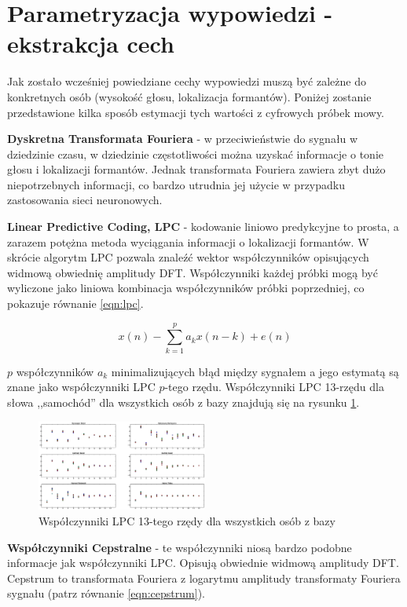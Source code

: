 \documentclass[journal]{IEEEtran}
\begin{document}
\section{Parametryzacja wypowiedzi - ekstrakcja cech}

Jak zostało wcześniej powiedziane cechy wypowiedzi muszą być zależne do
konkretnych osób (wysokość głosu, lokalizacja formantów). Poniżej zostanie
przedstawione kilka sposób estymacji tych wartości z cyfrowych próbek mowy.

\textbf{Dyskretna Transformata Fouriera} - w przeciwieństwie do sygnału w
dziedzinie czasu, w dziedzinie częstotliwości można uzyskać informacje o tonie
głosu i lokalizacji formantów. Jednak transformata Fouriera zawiera zbyt dużo
niepotrzebnych informacji, co bardzo utrudnia jej użycie w przypadku
zastosowania sieci neuronowych.

\textbf{Linear Predictive Coding, LPC} - kodowanie liniowo predykcyjne to
prosta, a zarazem potężna metoda wyciągania informacji o lokalizacji formantów.
W skrócie algorytm LPC pozwala znaleźć wektor współczynników opisujących
widmową obwiednię amplitudy DFT. Współczynniki każdej próbki mogą być wyliczone
jako liniowa kombinacja współczynników próbki poprzedniej, co pokazuje równanie
\ref{eqn:lpc}.

\begin{equation}\label{eqn:lpc}
    x(n) - \sum_{k=1}^p a_k x(n-k) + e(n)
\end{equation}

$p$ współczynników $a_k$ minimalizujących błąd między sygnałem a jego estymatą
są znane jako współczynniki LPC $p$-tego rzędu. Współczynniki LPC 13-rzędu dla
słowa ,,samochód'' dla wszystkich osób z bazy znajdują się na rysunku
\ref{fig:lpc}.

\begin{figure}
    \includegraphics[width=0.5\textwidth]{lpc_samochod}
    \caption{Współczynniki LPC 13-tego rzędy dla wszystkich osób z bazy}
    \label{fig:lpc}
\end{figure}

\textbf{Współczynniki Cepstralne} - te współczynniki niosą bardzo podobne
informacje jak współczynniki LPC. Opisują obwiednie widmową amplitudy DFT.
Cepstrum to transformata Fouriera z logarytmu amplitudy transformaty Fouriera
sygnału (patrz równanie \ref{eqn:cepstrum}).
\end{document}
